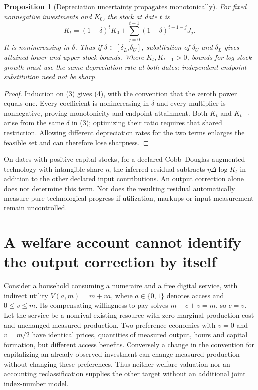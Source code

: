 \documentclass[11pt]{article}
\newtheorem{proposition}[theorem]{Proposition}
\theoremstyle{definition}
\begin{document}
\begin{proposition}[Depreciation uncertainty propagates monotonically]
For fixed nonnegative investments and $K_0$, the stock at date $t$ is
\[
 K_t=(1-\delta)^tK_0+\sum_{j=0}^{t-1}(1-\delta)^{t-1-j}J_j.
 \tag{4}
\]
It is nonincreasing in $\delta$. Thus if $\delta\in[\delta_L,\delta_U]$, substitution of $\delta_U$ and $\delta_L$ gives attained lower and upper stock bounds. Where $K_t,K_{t-1}>0$, bounds for log stock growth must use the same depreciation rate at both dates; independent endpoint substitution need not be sharp.
\end{proposition}
\begin{proof}
Induction on (3) gives (4), with the convention that the zeroth power equals one. Every coefficient is nonincreasing in $\delta$ and every multiplier is nonnegative, proving monotonicity and endpoint attainment. Both $K_t$ and $K_{t-1}$ arise from the same $\delta$ in (3); optimizing their ratio requires that shared restriction. Allowing different depreciation rates for the two terms enlarges the feasible set and can therefore lose sharpness.
\end{proof}
On dates with positive capital stocks, for a declared Cobb--Douglas augmented technology with intangible share $\eta$, the inferred residual subtracts $\eta\Delta\log K_t$ in addition to the other declared input contributions. An output correction alone does not determine this term. Nor does the resulting residual automatically measure pure technological progress if utilization, markups or input measurement remain uncontrolled.

\section*{A welfare account cannot identify the output correction by itself}
Consider a household consuming a numeraire and a free digital service, with indirect utility $V(a,m)=m+va$, where $a\in\{0,1\}$ denotes access and $0\le v\le m$. Its compensating willingness to pay solves $m-c+v=m$, so $c=v$. Let the service be a nonrival existing resource with zero marginal production cost and unchanged measured production. Two preference economies with $v=0$ and $v=m/2$ have identical prices, quantities of measured output, hours and capital formation, but different access benefits. Conversely a change in the convention for capitalizing an already observed investment can change measured production without changing these preferences. Thus neither welfare valuation nor an accounting reclassification supplies the other target without an additional joint index-number model.
\end{document}
